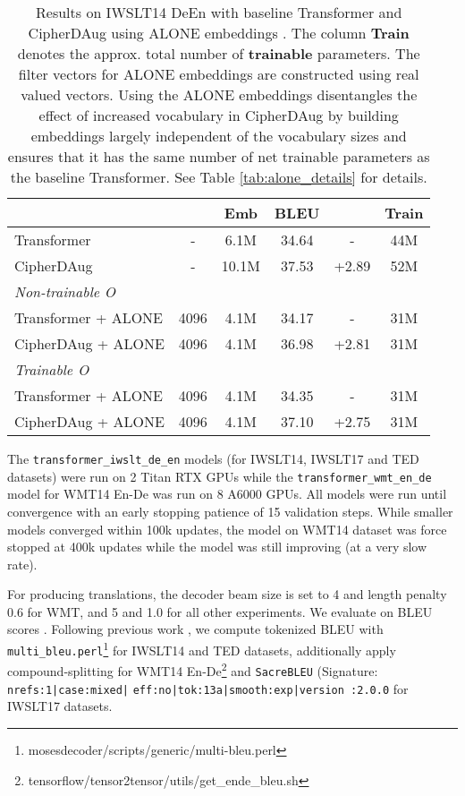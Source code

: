 \documentclass[11pt]{article}
\begin{document}
\begin{table*}[ht]
\small
\centering
\begin{tabular}{lcc|cc|c}
\toprule
 & \textbf{} & \textbf{Emb} & \textbf{BLEU} & \textbf{} & \textbf{Train} \\ \midrule
Transformer & - & 6.1M & 34.64 & - & 44M \\
CipherDAug & - & 10.1M & 37.53 & +2.89 & 52M \\
\midrule
\scriptsize{\quad \emph{Non-trainable O}} & & & & & \\ 
Transformer + ALONE & 4096 & 4.1M & 34.17 & - & 31M \\
CipherDAug + ALONE & 4096 & 4.1M & 36.98 & +2.81 & 31M \\ 
\midrule
\scriptsize{\quad \emph{Trainable O}} & & & & & \\ 
Transformer + ALONE & 4096 & 4.1M & 34.35 & - & 31M \\
CipherDAug + ALONE & 4096 & 4.1M & 37.10 & +2.75 & 31M \\
\bottomrule
\end{tabular}
\caption{Results on IWSLT14 DeEn with baseline Transformer and CipherDAug using ALONE embeddings \cite{alone-neurips20}. The column \textbf{Train} denotes the approx. total number of \textbf{trainable} parameters. The filter vectors for ALONE embeddings are constructed using real valued vectors. Using the ALONE embeddings disentangles the effect of increased vocabulary in CipherDAug by building embeddings largely independent of the vocabulary sizes and ensures that it has the same number of net trainable parameters as the baseline Transformer. See Table \ref{tab:alone_details} for details.}
\label{tab:alone}
\end{table*}


The \texttt{transformer\_iwslt\_de\_en} models (for IWSLT14, IWSLT17 and TED datasets) were run on 2 Titan RTX GPUs while the \texttt{transformer\_wmt\_en\_de} model for WMT14 En-De was run on 8 A6000 GPUs. All models were run until convergence with an early stopping patience of 15 validation steps. While smaller models converged within 100k updates, the model on WMT14 dataset was force stopped at 400k updates while the model was still improving (at a very slow rate). 

For producing translations, the decoder beam size is set to 4 and length penalty 0.6 for WMT, and 5 and 1.0 for all other experiments. We evaluate on BLEU scores \cite{papineni-etal-2002-bleu}. Following previous work \cite{vaswani2017attention,nguyen19datadiverse, xu2021bert}, we compute tokenized BLEU with \texttt{multi\_bleu.perl}\footnote{mosesdecoder/scripts/generic/multi-bleu.perl} for IWSLT14 and TED datasets, additionally apply compound-splitting for WMT14 En-De\footnote{tensorflow/tensor2tensor/utils/get\_ende\_bleu.sh} and \texttt{SacreBLEU} \cite{post-2018-call} (Signature: \texttt{nrefs:1|case:mixed|} \texttt{eff:no|tok:13a|smooth:exp|version :2.0.0}  for IWSLT17 datasets. 
\end{document}
